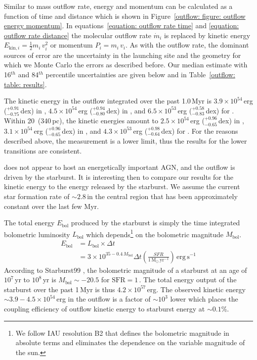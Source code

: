 Similar to mass outflow rate, energy and momentum can be calculated as a function of time and distance which is shown in Figure~\ref{outflow: figure: outflow energy momentum}. In equations~\ref{equation: outflow rate time} and \ref{equation: outflow rate distance} the molecular outflow rate $\dot{m}_i$ is replaced by kinetic energy $E_{\mathrm{kin},i} = \frac{1}{2} m_i\,v_i^2$ or momentum $P_i = m_i\,v_i$. As with the outflow rate, the dominant sources of error are the uncertainty in the launching site and the geometry for which we Monte Carlo the errors as described before. Our median estimate with 16$^{th}$ and 84$^{th}$ percentile uncertainties are given below and in Table~\ref{outflow: table: results}.

The kinetic energy in the outflow integrated over the past 1.0\,Myr is $3.9 \times 10^{54}$\,erg ($^{+0.91}_{-0.75}$\,dex) in , $4.5 \times 10^{54}$\,erg ($^{+0.94}_{-0.80}$\,dex) in , and $6.5 \times 10^{53}$\,erg ($^{+0.58}_{-0.83}$\,dex) for . Within 20\arcsec\ (340\,pc), the kinetic energies amount to $2.5 \times 10^{54}$\,erg ($^{+0.96}_{-0.65}$\,dex) in , $3.1 \times 10^{54}$\,erg ($^{+0.96}_{-0.65}$\,dex) in , and $4.3 \times 10^{53}$\,erg ($^{+0.98}_{-0.64}$\,dex) for . For the reasons described above, the  measurement is a lower limit, thus the results for the lower transitions are  consistent.

 does not appear to host an energetically important AGN, and the outflow is driven by the starburst. It is interesting then to compare our results for the kinetic energy to the energy released by the starburst. We assume the current star formation rate of $\sim 2.8$\,\Msunyr in the central region \citep{Ott:2005il,2015MNRAS.450L..80B} that has been approximately constant over the last few Myr.

The total energy $E_\mathrm{bol}$ produced by the starburst is simply the time integrated bolometric luminosity $L_\mathrm{bol}$ which depends\footnote{We follow IAU resolution B2 that defines the bolometric magnitude in absolute terms and eliminates the dependence on the variable magnitude of the sun.} on the bolometric magnitude $M_\mathrm{bol}$.
\begin{align}
    E_\mathrm{bol} &= L_\mathrm{bol} \times \Delta t\\
    &= 3 \times 10^{35-0.4\,M_\mathrm{bol}} \Delta t \left( \frac{SFR}{1\,\mathrm{M}_\odot\,\mathrm{yr}^{-1}} \right)\,\mathrm{erg\,s}^{-1}
    \label{equation: bolometric energy}
\end{align}
According to Starburst99 \citep[figure~46 in][]{Leitherer:1999jt}, the bolometric magnitude of a starburst at an age of $10^7$\,yr to $10^8$\,yr is $M_\mathrm{bol} \sim -20.5$ for $\mathrm{SFR} = 1$\,\Msunyr.
The total energy output of the starburst over the past 1\,Myr is thus $4.2 \times 10^{57}$\,erg. The observed kinetic energy $\sim3.9-4.5\times10^{54}$\,erg in the outflow is a factor of $\sim 10^3$ lower which places the coupling efficiency of outflow kinetic energy to starburst energy at $\sim 0.1$\%.


